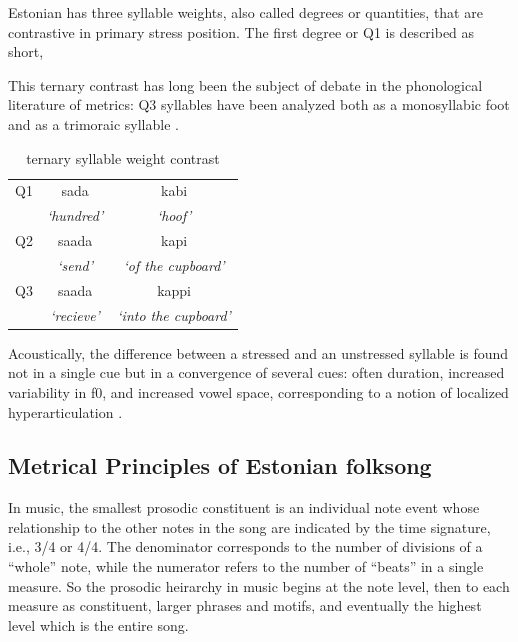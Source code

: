 Estonian has three syllable weights, also called degrees or quantities, that are contrastive in primary stress position. The first degree or Q1 is described as short, 

This ternary contrast has long been the subject of debate in the phonological literature of metrics: Q3 syllables have been analyzed both as a monosyllabic foot \citep{princeMetricalTheoryEstonian1980} and as a trimoraic syllable \citep{hayesCompensatoryLengtheningMoraic1989, kuznetsovaEstonianWordProsody2018,prillopMoraeEstonianReply2020}. 


 \begin{table}[htb]
\centering
\begin{tabular}{lcc}
\hline

Q1 &		 sada 		& 	kabi  \\  
	&	 {\it `hundred'} 	&	 {\it`hoof' }\\
\hline
Q2 &		saada 		&	kapi \\
	&	 {\it`send' }		&	{\it`of the cupboard' }		\\
\hline
Q3 &		saada 	&	 kappi 	\\
	&	{\it`recieve' }	&	{\it`into the cupboard' }	\\
\hline
\end{tabular}
\label{qexamps}
\caption{ternary syllable weight contrast}
\end{table}



Acoustically, the difference between a stressed and an unstressed syllable is found not in a single cue but in a convergence of several cues: often duration, increased variability in f0, and increased vowel space, corresponding to a notion of localized hyperarticulation \citep{smiljanicProductionPerceptionClear2005, de1995supraglottal, lindblom1990}. 



\subsection{Metrical Principles of Estonian folksong}


In music, the smallest prosodic constituent is an individual note event whose relationship to the other notes in the song are indicated by the time signature, i.e., 3/4 or 4/4. The denominator corresponds to the number of divisions of a ``whole'' note, while the numerator refers to the number of ``beats'' in a single measure. So the prosodic heirarchy in music begins at the note level, then to each measure as constituent, larger phrases and motifs, and eventually the highest level which is the entire song. 

